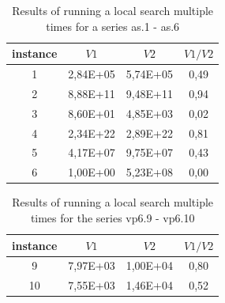 \documentclass{ifacconf}
\begin{document}
\begin{table}[ht]
	\centering
	\begin{tabular}{|c|c|c|c|}
		\hline
		\hspace*{0.1cm} instance \hspace*{0.1cm} &
		\hspace*{0.1cm}$V1$\hspace*{0.1cm}&
		\hspace*{0.1cm}$V2$\hspace*{0.1cm}&
		\hspace*{0.1cm}$V1/V2$\hspace*{0.1cm}\\
		\hline
		1 &  2,84E+05  &  5,74E+05 &   0,49\\
		2 &  8,88E+11  &  9,48E+11 &   0,94\\
		3 &  8,60E+01  &  4,85E+03 &   0,02\\
		4 &  2,34E+22  &  2,89E+22 &   0,81\\
		5 &  4,17E+07  &  9,75E+07 &   0,43\\
		6 &  1,00E+00  &  5,23E+08 &   0,00\\
		\hline
	\end{tabular}
	\caption{Results of running a local search multiple times for a series as.1 - as.6}	\label{spher_as}
\end{table}
\begin{table}[ht]
	\centering
	\begin{tabular}{|c|c|c|c|}
		\hline
		\hspace*{0.1cm}instance \hspace*{0.1cm} &
		\hspace*{0.1cm}$V1$\hspace*{0.1cm}&
		\hspace*{0.1cm}$V2$\hspace*{0.1cm}&
		\hspace*{0.1cm}$V1/V2$\hspace*{0.1cm}\\
		\hline
		9  & 7,97E+03  &  1,00E+04  &  0,80\\
		10 & 7,55E+03  &  1,46E+04  &  0,52\\
		\hline
	\end{tabular}
	\caption{Results of running a local search multiple times for the series vp6.9 - vp6.10}	\label{spher_vp6}
\end{table}
\end{document}
